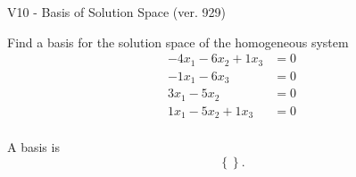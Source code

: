\begin{exercise}
  \begin{exerciseTitle}V10 - Basis of Solution Space (ver. 929)\end{exerciseTitle}
  \begin{exerciseStatement}
    Find a basis for the solution space of the homogeneous system 
\begin{align*}
 -4 x_ 1 -6 x_ 2 + 1 x_ 3 &= 0  \\ 
  -1 x_ 1 -6 x_ 3 &= 0  \\ 
  3 x_ 1 -5 x_ 2 &= 0  \\ 
  1 x_ 1 -5 x_ 2 + 1 x_ 3 &= 0  \\ 
 \end{align*}


 
  \end{exerciseStatement}

  \begin{exerciseAnswer}
   A basis is   
\[\left\{\right\}.\]

  


  \end{exerciseAnswer}
\end{exercise}